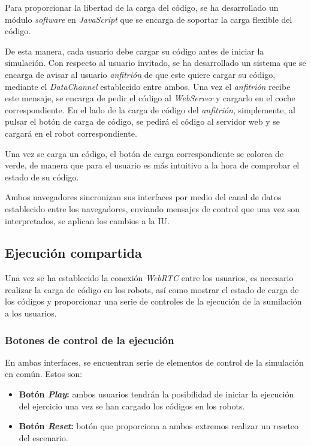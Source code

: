 \documentclass[a4paper, 12pt]{book}
\begin{document}
Para proporcionar la libertad de la carga del código, se ha desarrollado un módulo \emph{software} en \emph{JavaScript} que se encarga de soportar la carga flexible del código.

De esta manera, cada usuario debe cargar su código antes de iniciar la simulación. Con respecto al usuario invitado, se ha desarrollado un sistema que se encarga de avisar al usuario \emph{anfitrión} de que este quiere cargar su código, mediante el \emph{DataChannel} establecido entre ambos. Una vez el \emph{anfitrión} recibe este mensaje, se encarga de pedir el código al \emph{WebServer} y cargarlo en el coche correspondiente. En el lado de la carga de código del \emph{anfitrión}, simplemente, al pulsar el botón de carga de código, se pedirá el código al servidor web y se cargará en el robot correspondiente.

Una vez se carga un código, el botón de carga correspondiente se colorea de verde, de manera que para el usuario es más intuitivo a la hora de comprobar el estado de su código.

Ambos navegadores sincronizan sus interfaces por medio del canal de datos establecido entre los navegadores, enviando mensajes de control que una vez son interpretados, se aplican los cambios a la IU.

\subsection{Ejecución compartida}

Una vez se ha establecido la conexión \emph{WebRTC} entre los usuarios, es necesario realizar la carga de código en los robots, así como mostrar el estado de carga de los códigos y proporcionar una serie de controles de la ejecución de la sumilación a los usuarios.

\subsubsection{Botones de control de la ejecución}

En ambas interfaces, se encuentran serie de elementos de control de la simulación en común. Estos son:

\begin{itemize}
\item \textbf{Botón \emph{Play}:} ambos usuarios tendrán la posibilidad de iniciar la ejecución del ejercicio una vez se han cargado los códigos en los robots.

\item \textbf{Botón \emph{Reset}:} botón que proporciona a ambos extremos realizar un reseteo del escenario.
\end{itemize}
\end{document}

